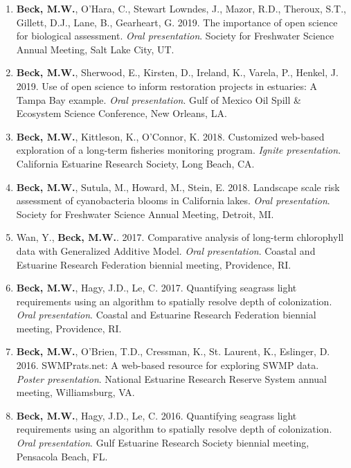 \documentclass[letterpaper,12pt]{article}
\begin{document}
\begin{enumerate}

\item \textbf{Beck, M.W.}, O'Hara, C., Stewart Lowndes, J., Mazor, R.D., Theroux, S.T., Gillett, D.J., Lane, B., Gearheart, G. 2019. The importance of open science for biological assessment. \textit{Oral presentation}. Society for Freshwater Science Annual Meeting, Salt Lake City, UT.

\item {\bf Beck, M.W.}, Sherwood, E., Kirsten, D., Ireland, K., Varela, P., Henkel, J. 2019. Use of open science to inform restoration projects in estuaries: A Tampa Bay example. \textit{Oral presentation}. Gulf of Mexico Oil Spill \& Ecosystem Science Conference, New Orleans, LA.

\item {\bf Beck, M.W.}, Kittleson, K., O'Connor, K. 2018. Customized web-based exploration of a long-term fisheries monitoring program. \textit{Ignite presentation}. California Estuarine Research Society, Long Beach, CA.

\item {\bf Beck, M.W.}, Sutula, M., Howard, M., Stein, E. 2018. Landscape scale risk assessment of cyanobacteria blooms in California lakes. \textit{Oral presentation}. Society for Freshwater Science Annual Meeting, Detroit, MI.

\item Wan, Y., {\bf Beck, M.W.}. 2017. Comparative analysis of long-term chlorophyll data with Generalized Additive Model. \textit{Oral presentation}. Coastal and Estuarine Research Federation biennial meeting, Providence, RI.

\item {\bf Beck, M.W.}, Hagy, J.D., Le, C. 2017. Quantifying seagrass light requirements using an algorithm to spatially resolve depth of colonization. \textit{Oral presentation}. Coastal and Estuarine Research Federation biennial meeting, Providence, RI.

\item {\bf Beck, M.W.}, O'Brien, T.D., Cressman, K., St. Laurent, K., Eslinger, D. 2016. SWMPrats.net: A web-based resource for exploring SWMP data. \textit{Poster presentation}. National Estuarine Research Reserve System annual meeting, Williamsburg, VA. 

\item {\bf Beck, M.W.}, Hagy, J.D., Le, C. 2016. Quantifying seagrass light requirements using an algorithm to spatially resolve depth of colonization. \textit{Oral presentation}. Gulf Estuarine Research Society biennial meeting, Pensacola Beach, FL.


\end{enumerate}
\end{document}
